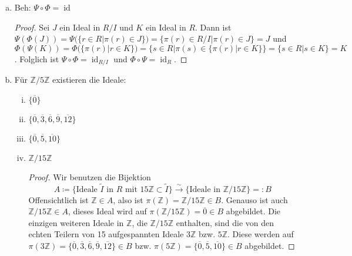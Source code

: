 \documentclass{article}
\theoremstyle{definition}
\newcommand{\Z}{\mathbb{Z}}
\begin{document}
\begin{enumerate}[(a)]
\begin{itemize}
	\end{itemize} 
	\item Beh: $\Psi\circ\Phi =\operatorname{id}$ 
	\begin{proof}
		Sei $J$ ein Ideal in $R/I$ und $K$ ein Ideal in $R$. %
		Dann ist $\Psi(\Phi(J)) = \Psi(\{r \in R|\pi(r) \in J\}) = \{\pi(r)\in R/I|\pi(r) \in J\} = J$ und 
		$\Phi(\Psi(K)) = \Phi(\{\pi(r)|r\in K\}) = \{s\in R|\pi(s) \in \{\pi(r)|r\in K\}\} = \{s\in R| s \in K\} = K$. Folglich ist $\Psi \circ \Phi = \operatorname{id}_{R/I}$ und $\Phi\circ \Psi = \operatorname{id}_{R}$.
	\end{proof}
	\item Für $\Z/5\Z$ existieren die Ideale: 
	\begin{enumerate}[(i)]
		\item $\{\overline{0}\}$
		\item $\{\overline{0},\overline{3},\overline{6},\overline{9},\overline{12}\}$
		\item $\{\overline{0},\overline{5},\overline{10}\}$
		\item $\Z/15\Z$
		\begin{proof}
			Wir benutzen die Bijektion $$A \coloneqq \{\text{Ideale $\tilde{I}$ in $R$ mit } 15\Z \subset \tilde{I}\} \xrightarrow{\sim} \{\text{Ideale in }\Z/15\Z\} =: B$$
			Offensichtlich ist $\Z \in A$, also ist $\pi(\Z) = \Z/15\Z\in B$. Genauso ist auch $\Z/15\Z \in A$, dieses Ideal wird auf $\pi(\Z/15\Z) = \overline{0}\in B$ abgebildet. Die einzigen weiteren Ideale in $\Z$, die $\Z/15\Z$ enthalten, sind die von den echten Teilern von 15 aufgespannten Ideale $3\Z$ bzw. $5\Z$. Diese werden auf $\pi(3\Z) = \{\overline{0},\overline{3},\overline{6},\overline{9},\overline{12}\}\in B$ bzw. $\pi(5\Z) = \{\overline{0},\overline{5},\overline{10}\}\in B$ abgebildet.
		\end{proof}
	\end{enumerate}
\end{enumerate}
\end{document}
